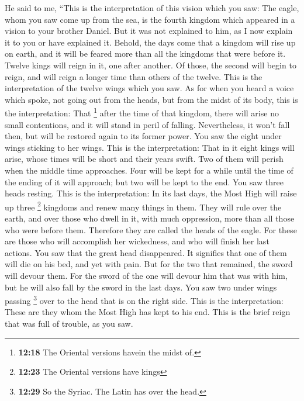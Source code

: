  He said to me, ``This is the interpretation of this
vision which you saw:  The eagle, whom you saw come up
from the sea, is the fourth kingdom which appeared in a vision to your
brother Daniel.  But it was not explained to him, as I
now explain it to you or have explained it.  Behold, the
days come that a kingdom will rise up on earth, and it will be feared
more than all the kingdoms that were before it.  Twelve
kings will reign in it, one after another.  Of those, the
second will begin to reign, and will reign a longer time than others of
the twelve.  This is the interpretation of the twelve
wings which you saw.  As for when you heard a voice which
spoke, not going out from the heads, but from the midst of its body,
this is the interpretation:  That \footnote{\textbf{12:18}
  The Oriental versions havein the midst of.} after the time of that
kingdom, there will arise no small contentions, and it will stand in
peril of falling. Nevertheless, it won't fall then, but will be restored
again to its former power.  You saw the eight under wings
sticking to her wings. This is the interpretation:  That
in it eight kings will arise, whose times will be short and their years
swift.  Two of them will perish when the middle time
approaches. Four will be kept for a while until the time of the ending
of it will approach; but two will be kept to the end. 
You saw three heads resting. This is the interpretation: 
In its last days, the Most High will raise up three \footnote{\textbf{12:23}
  The Oriental versions have kings} kingdoms and renew many things in
them. They will rule over the earth,  and over those who
dwell in it, with much oppression, more than all those who were before
them. Therefore they are called the heads of the eagle. 
For these are those who will accomplish her wickedness, and who will
finish her last actions.  You saw that the great head
disappeared. It signifies that one of them will die on his bed, and yet
with pain.  But for the two that remained, the sword will
devour them.  For the sword of the one will devour him
that was with him, but he will also fall by the sword in the last days.
 You saw two under wings passing \footnote{\textbf{12:29}
  So the Syriac. The Latin has over the head.} over to the head that is
on the right side.  This is the interpretation: These are
they whom the Most High has kept to his end. This is the brief reign
that was full of trouble, as you saw.

